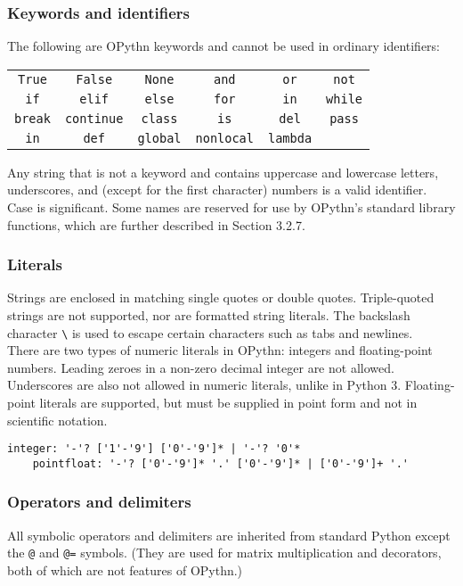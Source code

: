 \documentclass[11pt, twoside]{article}
\newcommand{\ms}{\texttt}
\begin{document}
    \subsubsection{Keywords and identifiers}
    The following are OPythn keywords and cannot be used in ordinary identifiers:
    \begin{center}
        \begin{tabular}{cccccc}
            \ms{True} & \ms{False} & \ms{None} & \ms{and} & \ms{or} & \ms{not}\\
            \ms{if} & \ms{elif} & \ms{else} & \ms{for} & \ms{in} & \ms{while}\\
            \ms{break} & \ms{continue} & \ms{class} & \ms{is} & \ms{del} & \ms{pass}\\
            \ms{in} & \ms{def} &\ms{global} & \ms{nonlocal} & \ms{lambda} &
    \end{tabular}
    \end{center}
    Any string that is not a keyword and contains uppercase and lowercase letters, underscores, and (except for the first character) numbers is a valid identifier. Case is significant. Some names are reserved for use by OPythn's standard library functions, which are further described in Section 3.2.7.
    \subsubsection{Literals}
    Strings are enclosed in matching single quotes or double quotes. Triple-quoted strings are not supported, nor are formatted string literals. The backslash character \ms{\textbackslash} is used to escape certain characters such as tabs and newlines.\\
    \indent There are two types of numeric literals in OPythn: integers and floating-point numbers. Leading zeroes in a non-zero decimal integer are not allowed. Underscores are also not allowed in numeric literals, unlike in Python 3. Floating-point literals are supported, but must be supplied in point form and not in scientific notation.
    \begin{lstlisting}[language=caml]
    integer: '-'? ['1'-'9'] ['0'-'9']* | '-'? '0'*
    pointfloat: '-'? ['0'-'9']* '.' ['0'-'9']* | ['0'-'9']+ '.'
    \end{lstlisting}
    \subsubsection{Operators and delimiters}
    All symbolic operators and delimiters are inherited from standard Python except the \ms{@} and \ms{@=} symbols. (They are used for matrix multiplication and decorators, both of which are not features of OPythn.)
\end{document}
